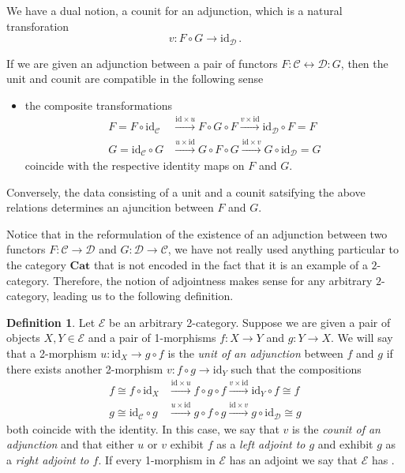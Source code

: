 \documentclass[a4paper,11pt]{article}
\newcommand{\ccal}{\mathcal{C}}
\newcommand{\dcal}{\mathcal{D}}
\newcommand{\ecal}{\mathcal{E}}
\newcommand{\ide}{\mathrm{id}}
\theoremstyle{plain}
\theoremstyle{definition}
\newtheorem{defi}[thm]{Definition}
\theoremstyle{remark}
\begin{document}
We have a dual notion, a counit for an adjunction, which is a natural transforation $$v \colon F \circ G \to \ide_{\dcal} \, .$$

If we are given an adjunction between a pair of functors $F \colon \ccal \longleftrightarrow \dcal \colon G$, then the unit and counit are compatible in the following sense 
\begin{itemize}
    \item the composite transformations 
    \begin{align*}
        F = F \circ \ide_{\ccal} & \xrightarrow{\ide \times u} F \circ G \circ F \xrightarrow{v \times \ide} \ide_{\dcal} \circ F = F\\
        G = \ide_{\ccal} \circ G & \xrightarrow{u \times \ide} G \circ F \circ G \xrightarrow{\ide \times v} G \circ \ide_{\dcal} = G
    \end{align*}
    coincide with the respective identity maps on $F$ and $G$.
\end{itemize}


Conversely, the data consisting of a unit and a counit satsifying the above relations determines an ajuncition between $F$ and $G$. 



Notice that in the reformulation of the existence of an adjunction between two functors $F \colon \ccal \to \dcal$ and $G \colon \dcal \to \ccal$, we have not really used anything particular to the category $\textbf{Cat}$ that is not encoded in the fact that it is an example of a $2$-category. Therefore, the notion of adjointness makes sense for any arbitrary $2$-category, leading us to the following definition. 



\begin{defi}
\label{admits_adjoints}
Let $\ecal$ be an arbitrary 2-category. Suppose we are given a pair of objects $X, Y \in \ecal$ and a pair of 1-morphisms $f \colon X \to Y$ and $g \colon Y \to X$. We will say that a 2-morphism $u \colon \ide_X \to g \circ f$ is the \textit{unit of an adjunction} between $f$ and $g$ if there exists another 2-morphism $v \colon f \circ g \to \ide_Y$ such that the compositions 
\begin{align*}
    f \cong f \circ \ide_X & \xrightarrow{\ide \times u} f \circ g \circ f \xrightarrow{v \times \ide} \ide_Y \circ f \cong f\\
    g \cong \ide_{\ccal} \circ g & \xrightarrow{u \times \ide} g \circ f \circ g \xrightarrow{\ide \times v} g \circ \ide_{\dcal} \cong g
\end{align*}
both coincide with the identity. In this case, we say that $v$ is the \textit{counit of an adjunction} and that either $u$ or $v$ exhibit $f$ as a \textit{left adjoint to $g$} and exhibit $g$ as a \textit{right adjoint to $f$}. If every 1-morphism in $\ecal$ has an adjoint we say that $\ecal$ has .
\end{defi}
\end{document}

